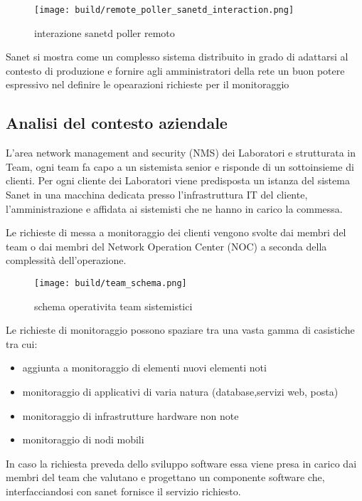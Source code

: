 \documentclass[12pt,a4paper,twoside,openright]{book}
\begin{document}
\begin{figure}[H]
    \centering
    \texttt{[image: build/remote\_poller\_sanetd\_interaction.png]}
    \caption{interazione sanetd poller remoto}
    \label{fig:enter-label}
\end{figure}

Sanet si mostra come un complesso sistema distribuito in grado di adattarsi al contesto di produzione e fornire agli amministratori della rete un buon potere espressivo nel definire le opearazioni richieste per il monitoraggio

\subsection{Analisi del contesto aziendale}

L'area network management and security (NMS) dei Laboratori e strutturata in Team, ogni team fa capo a un sistemista senior e risponde di un sottoinsieme di clienti. Per ogni cliente dei Laboratori viene predisposta un istanza del sistema Sanet in una macchina dedicata presso l'infrastruttura IT del cliente, l'amministrazione e affidata ai sistemisti che ne hanno in carico la commessa.

Le richieste di messa a monitoraggio dei clienti vengono svolte dai membri del team o dai membri del Network Operation Center (NOC) a seconda della complessità dell'operazione.

\begin{figure}[H]
    \centering
    \texttt{[image: build/team\_schema.png]}
    \caption{schema operativita team sistemistici}
    \label{fig:enter-label}
\end{figure}

Le richieste di monitoraggio possono spaziare tra una vasta gamma di casistiche tra cui:

\begin{itemize}
  \item{aggiunta a monitoraggio di elementi nuovi elementi noti}
  \item{monitoraggio di applicativi di varia natura (database,servizi web, posta)}
  \item{monitoraggio di infrastrutture hardware non note}
  \item{monitoraggio di nodi mobili}
\end{itemize}

In caso la richiesta preveda dello sviluppo software essa viene presa in carico dai membri del team che valutano e progettano un componente software che, interfacciandosi con sanet fornisce il servizio richiesto.
\end{document}
